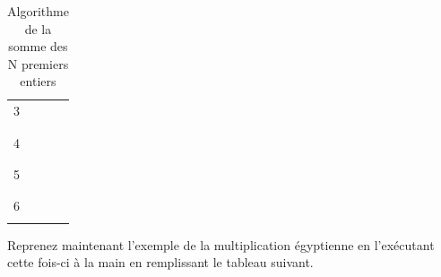 \documentclass[11pt,a4paper]{article}
\begin{document}
\begin{table}[!ht]
\begin{minipage}{0.4\textwidth}
\begin{tabular}{|C{1cm}|C{1cm}|C{1cm}|}
        3    &    &       \\
             &    &       \\
        \hline
             &    &       \\
        4    &    &       \\
             &    &       \\
        \hline
             &    &       \\
        5    &    &       \\
             &    &       \\
        \hline
             &    &       \\
        6    &    &       \\
             &    &       \\
        \hline
    \end{tabular}
  \end{minipage}
  \caption{Algorithme de la somme des N premiers entiers}
  \label{somme-n-premiers-entiers}
\end{table}


\vfillLast

\newpage

\vfillFirst


Reprenez maintenant l'exemple de la multiplication égyptienne en l'exécutant cette fois-ci à la main en remplissant le tableau suivant.



\bigskip
\end{document}
